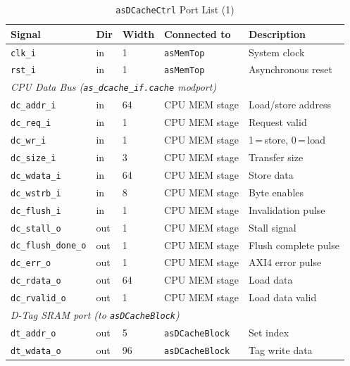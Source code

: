 \begin{table}[H]
\caption{\texttt{asDCacheCtrl} Port List (1)}
\label{tab:asDCacheCtrlPorts}
\centering
\begin{tabularx}{\textwidth}{|l |l |l |l |X|}
  \hline
  Signal & Dir & Width & Connected to & Description \\
  \hline
  \hline
  \texttt{clk\_i}  & in & 1 & \texttt{asMemTop} & System clock \\
  \hline
  \texttt{rst\_i}  & in & 1 & \texttt{asMemTop} & Asynchronous reset \\
  \hline
  \multicolumn{5}{|l|}{\textit{CPU Data Bus (\texttt{as\_dcache\_if.cache} modport)}} \\
  \hline
  \texttt{dc\_addr\_i}        & in  & 64 & CPU MEM stage & Load/store address \\
  \hline
  \texttt{dc\_req\_i}         & in  & 1  & CPU MEM stage & Request valid \\
  \hline
  \texttt{dc\_wr\_i}          & in  & 1  & CPU MEM stage & 1\,=\,store, 0\,=\,load \\
  \hline
  \texttt{dc\_size\_i}        & in  & 3  & CPU MEM stage & Transfer size \\
  \hline
  \texttt{dc\_wdata\_i}       & in  & 64 & CPU MEM stage & Store data \\
  \hline
  \texttt{dc\_wstrb\_i}       & in  & 8  & CPU MEM stage & Byte enables \\
  \hline
  \texttt{dc\_flush\_i}       & in  & 1  & CPU MEM stage & Invalidation pulse \\
  \hline
  \texttt{dc\_stall\_o}       & out & 1  & CPU MEM stage & Stall signal \\
  \hline
  \texttt{dc\_flush\_done\_o} & out & 1  & CPU MEM stage & Flush complete pulse \\
  \hline
  \texttt{dc\_err\_o}         & out & 1  & CPU MEM stage & AXI4 error pulse \\
  \hline
  \texttt{dc\_rdata\_o}       & out & 64 & CPU MEM stage & Load data \\
  \hline
  \texttt{dc\_rvalid\_o}      & out & 1  & CPU MEM stage & Load data valid \\
  \hline
  \multicolumn{5}{|l|}{\textit{D-Tag SRAM port (to \texttt{asDCacheBlock})}} \\
  \hline
  \texttt{dt\_addr\_o}  & out & 5   & \texttt{asDCacheBlock} & Set index \\
  \hline
  \texttt{dt\_wdata\_o} & out & 96  & \texttt{asDCacheBlock} & Tag write data \\

\end{tabularx}
\end{table}
